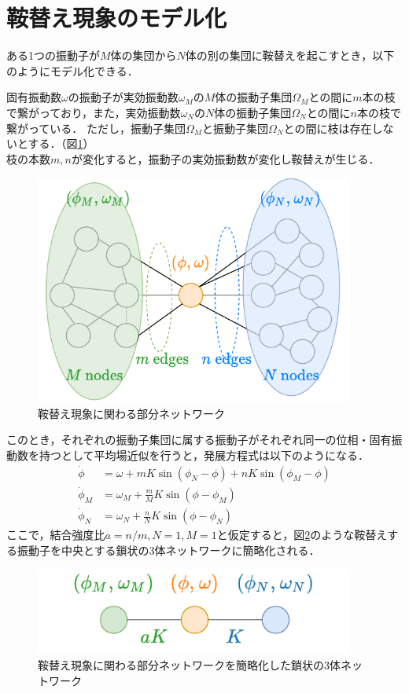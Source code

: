 \documentclass[../main]{subfiles}
\begin{document}
\section{鞍替え現象のモデル化}
ある1つの振動子が$M$体の集団から$N$体の別の集団に鞍替えを起こすとき，以下のようにモデル化できる．
\begin{screen}
固有振動数$\omega$の振動子が実効振動数$\omega_M$の$M$体の振動子集団$\Omega_M$との間に$m$本の枝で繋がっており，また，実効振動数$\omega_N$の$N$体の振動子集団$\Omega_N$との間に$n$本の枝で繋がっている．
ただし，振動子集団$\Omega_M$と振動子集団$\Omega_N$との間に枝は存在しないとする．（図\ref{fig:switch}）\\
枝の本数$m,n$が変化すると，振動子の実効振動数が変化し鞍替えが生じる．
\end{screen}
\begin{figure}[t]
\centering
\includegraphics[width=105mm]{./images/three_obj_before.pdf}
\centering
\caption{鞍替え現象に関わる部分ネットワーク}
\label{fig:switch}
\end{figure}
このとき，それぞれの振動子集団に属する振動子がそれぞれ同一の位相・固有振動数を持つとして平均場近似を行うと，発展方程式は以下のようになる．
\begin{align*}
    \dot{\phi}&=\omega+mK\sin\left( \phi_N-\phi \right)+nK\sin\left( \phi_M-\phi \right)\\
    \dot{\phi}_M&=\omega_M+\frac{m}{M}K\sin\left( \phi-\phi_M \right) \\
    \dot{\phi}_N&=\omega_N+\frac{n}{N}K\sin\left( \phi-\phi_N \right)    
\end{align*}
ここで，結合強度比$a=n/m,N=1,M=1$と仮定すると，図\ref{fig:3body}のような鞍替えする振動子を中央とする鎖状の3体ネットワークに簡略化される．\\
\begin{figure}[t]
    \centering
    \includegraphics[width=105mm]{./images/three_obj_after.pdf}
    \centering
    \caption{鞍替え現象に関わる部分ネットワークを簡略化した鎖状の3体ネットワーク}
    \label{fig:3body}
\end{figure}
\end{document}
